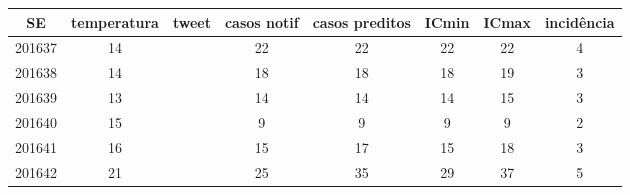 \begin{tabular}{c|ccccccc}
  \hline
SE & temperatura & tweet & casos notif & casos preditos & ICmin & ICmax & incidência \\ 
  \hline
201637 & 14 &  & 22 & 22 & 22 & 22 & 4 \\ 
  201638 & 14 &  & 18 & 18 & 18 & 19 & 3 \\ 
  201639 & 13 &  & 14 & 14 & 14 & 15 & 3 \\ 
  201640 & 15 &  & 9 & 9 & 9 & 9 & 2 \\ 
  201641 & 16 &  & 15 & 17 & 15 & 18 & 3 \\ 
  201642 & 21 &  & 25 & 35 & 29 & 37 & 5 \\ 
   \hline
\end{tabular}
